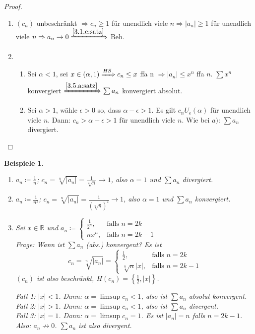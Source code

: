 \documentclass[titlepage,ngerman,a4paper,headsepline]{scrartcl}
\newcommand{\R}{\mathbb{R}}
\theoremstyle{named}
\theoremstyle{dotless}
\newtheorem*{beispiele}{Beispiele}
\begin{document}
\begin{proof} ~\
	\begin{enumerate}
		\item $(c_{n})$ unbeschränkt $\Rightarrow c_{n} \geq 1$ für unendlich viele $n \Rightarrow |a_{n}| \geq 1$ für unendlich viele $n \Rightarrow a_{n} \rightarrow 0 \xRightarrow[]{\ref{3.1.c:satz}}$ Beh.
		\item  %
			\begin{enumerate}
				\item Sei $\alpha < 1$, sei $x \in (\alpha, 1) \xRightarrow[]{HS} c_{n} \leq x$ ffa n $\Rightarrow |a_{n}| \leq x^{n}$ ffa $n$. $\sum x^{n}$ konvergiert $\xRightarrow[]{\ref{3.5.a:satz}} \sum a_{n}$ konvergiert absolut. 
				\item Sei $\alpha > 1$, wähle $\epsilon > 0$ so, dass $\alpha - \epsilon > 1$. Es gilt $c_{n} U_{\epsilon}(\alpha)$ für unendlich viele $n$. Dann: $c_{n} > \alpha - \epsilon > 1$ für unendlich viele $n$. Wie bei $a)$: $\sum a_{n}$ divergiert. 
			\end{enumerate}
	\end{enumerate}
\end{proof}


\begin{beispiele} ~\
	\begin{enumerate}
		\item $a_{n} \coloneqq \frac{1}{n}$; $c_{n} = \sqrt[n]{|a_{n}|} = \frac{1}{\sqrt[n]{n}} \rightarrow 1$, also $\alpha = 1$ und $\sum a_{n}$ divergiert.
		\item $a_{n} \coloneqq \frac{1}{n^{2}}$; $c_{n} = \sqrt[n]{|a_{n}|} = \frac{1}{(\sqrt[n]{n})^{2}} \rightarrow 1$, also $\alpha = 1$ und $\sum a_{n}$ konvergiert.
		\item Sei $x \in \R$ und $a_{n} \coloneqq \begin{cases} \frac{1}{2^{n}}, & \text{falls } n = 2k \\ n x^{n}, & \text{falls } n = 2k - 1 \end{cases}$ \\
			Frage: Wann ist $\sum a_{n}$ (abs.) konvergent? Es ist
				$$ c_{n} = \sqrt[n]{|a_{n}|} = \begin{cases} \frac{1}{2}, & \text{falls } n = 2k \\ \sqrt[n]{n}|x|, & \text{falls } n = 2k - 1 \end{cases} $$
			$(c_{n})$ ist also beschränkt, $H(c_{n}) = \left\{ \frac{1}{2}, |x| \right\}$.  
			
			Fall 1: $|x| < 1$. Dann: $\alpha = \limsup c_{n} < 1$, also ist $\sum a_{n}$ absolut konvergent. \\
			Fall 2: $|x| > 1$. Dann: $\alpha = \limsup c_{n} < 1$, also ist $\sum a_{n}$ divergent. \\
			Fall 3: $|x| = 1$. Dann: $\alpha = \limsup c_{n} = 1$. Es ist $|a_{n}| = n$ falls $n = 2k - 1$. Also: $a_{n} \not\rightarrow 0$. $\sum a_{n}$ ist also divergent.			
	\end{enumerate}	
\end{beispiele}
\end{document}
